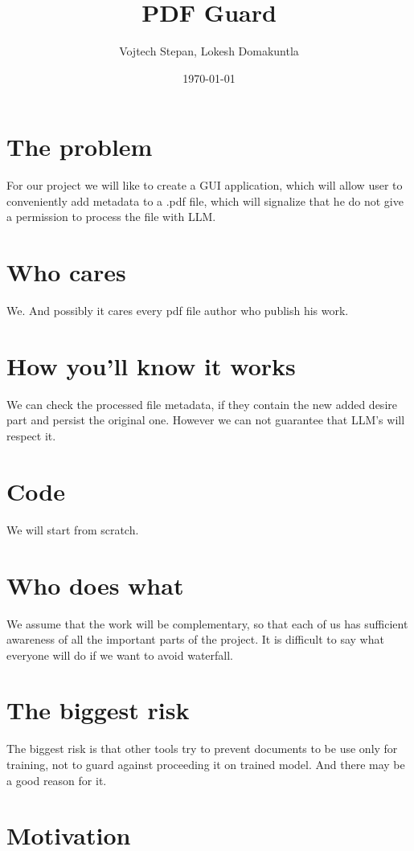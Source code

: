 \documentclass[11pt]{article}
\title{PDF Guard}
\author{Vojtech Stepan, Lokesh Domakuntla}
\date{\today}
\begin{document}
\maketitle

\section*{The problem}
For our project we will like to create a GUI application,
which will allow user to conveniently add metadata to a .pdf file,
which will signalize that he do not give a permission to process the file with LLM.

\section*{Who cares}
We. And possibly it cares every pdf file author who publish his work.

\section*{How you’ll know it works}
We can check the processed file metadata, if they contain the new added desire
part and persist the original one. However we can not guarantee that LLM's will
respect it.

\section*{Code}
We will start from scratch.

\section*{Who does what}
We assume that the work will be complementary, so that each of us has sufficient awareness of all the important parts of the project.
It is difficult to say what everyone will do if we want to avoid waterfall.

\section*{The biggest risk}

The biggest risk is that other tools try to prevent documents to be use only for
training, not to guard against proceeding it on trained model. And there may be
a good reason for it.

\section*{Motivation}
\end{document}
